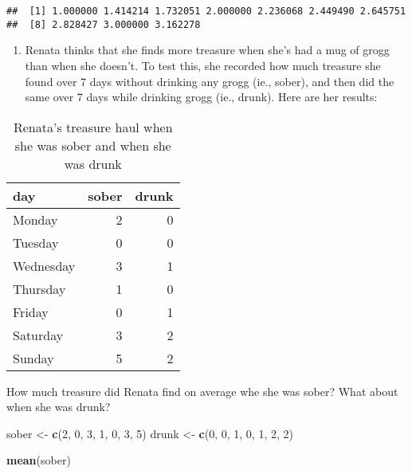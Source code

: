 \documentclass[]{book}
\newenvironment{Shaded}{\begin{snugshade}}{\end{snugshade}}
\newcommand{\KeywordTok}[1]{\textcolor[rgb]{0.13,0.29,0.53}{\textbf{{#1}}}}
\newcommand{\DecValTok}[1]{\textcolor[rgb]{0.00,0.00,0.81}{{#1}}}
\newcommand{\StringTok}[1]{\textcolor[rgb]{0.31,0.60,0.02}{{#1}}}
\newcommand{\NormalTok}[1]{{#1}}
\providecommand{\tightlist}{%
  \setlength{\itemsep}{0pt}\setlength{\parskip}{0pt}}
\begin{document}
\begin{verbatim}
##  [1] 1.000000 1.414214 1.732051 2.000000 2.236068 2.449490 2.645751
##  [8] 2.828427 3.000000 3.162278
\end{verbatim}

\begin{enumerate}
\def\labelenumi{\arabic{enumi}.}
\setcounter{enumi}{1}
\tightlist
\item
  Renata thinks that she finds more treasure when she's had a mug of
  grogg than when she doesn't. To test this, she recorded how much
  treasure she found over 7 days without drinking any grogg (ie.,
  sober), and then did the same over 7 days while drinking grogg (ie.,
  drunk). Here are her results:
\end{enumerate}

\begin{table}

\caption{\label{tab:unnamed-chunk-15}Renata's treasure haul when she was sober and when she was drunk}
\centering
\begin{tabular}[t]{l|r|r}
\hline
day & sober & drunk\\
\hline
Monday & 2 & 0\\
\hline
Tuesday & 0 & 0\\
\hline
Wednesday & 3 & 1\\
\hline
Thursday & 1 & 0\\
\hline
Friday & 0 & 1\\
\hline
Saturday & 3 & 2\\
\hline
Sunday & 5 & 2\\
\hline
\end{tabular}
\end{table}

How much treasure did Renata find on average whe she was sober? What
about when she was drunk?

\begin{Shaded}
\begin{Highlighting}[]
\NormalTok{sober <-}\StringTok{ }\KeywordTok{c}\NormalTok{(}\DecValTok{2}\NormalTok{, }\DecValTok{0}\NormalTok{, }\DecValTok{3}\NormalTok{, }\DecValTok{1}\NormalTok{, }\DecValTok{0}\NormalTok{, }\DecValTok{3}\NormalTok{, }\DecValTok{5}\NormalTok{)}
\NormalTok{drunk <-}\StringTok{ }\KeywordTok{c}\NormalTok{(}\DecValTok{0}\NormalTok{, }\DecValTok{0}\NormalTok{, }\DecValTok{1}\NormalTok{, }\DecValTok{0}\NormalTok{, }\DecValTok{1}\NormalTok{, }\DecValTok{2}\NormalTok{, }\DecValTok{2}\NormalTok{)}

\KeywordTok{mean}\NormalTok{(sober)}
\end{Highlighting}
\end{Shaded}
\end{document}
